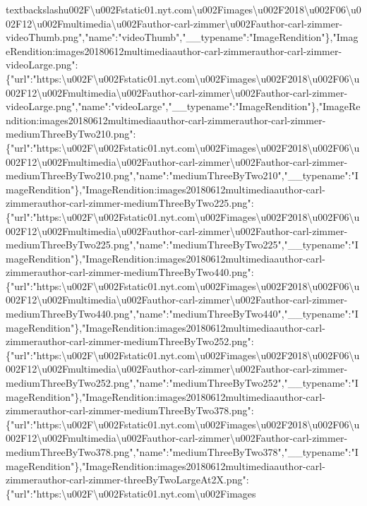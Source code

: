 textbackslash{}u002F\textbackslash{}u002Fstatic01.nyt.com\textbackslash{}u002Fimages\textbackslash{}u002F2018\textbackslash{}u002F06\textbackslash{}u002F12\textbackslash{}u002Fmultimedia\textbackslash{}u002Fauthor-carl-zimmer\textbackslash{}u002Fauthor-carl-zimmer-videoThumb.png","name":"videoThumb","\_\_typename":"ImageRendition"\},"ImageRendition:images20180612multimediaauthor-carl-zimmerauthor-carl-zimmer-videoLarge.png":\{"url":"https:\textbackslash{}u002F\textbackslash{}u002Fstatic01.nyt.com\textbackslash{}u002Fimages\textbackslash{}u002F2018\textbackslash{}u002F06\textbackslash{}u002F12\textbackslash{}u002Fmultimedia\textbackslash{}u002Fauthor-carl-zimmer\textbackslash{}u002Fauthor-carl-zimmer-videoLarge.png","name":"videoLarge","\_\_typename":"ImageRendition"\},"ImageRendition:images20180612multimediaauthor-carl-zimmerauthor-carl-zimmer-mediumThreeByTwo210.png":\{"url":"https:\textbackslash{}u002F\textbackslash{}u002Fstatic01.nyt.com\textbackslash{}u002Fimages\textbackslash{}u002F2018\textbackslash{}u002F06\textbackslash{}u002F12\textbackslash{}u002Fmultimedia\textbackslash{}u002Fauthor-carl-zimmer\textbackslash{}u002Fauthor-carl-zimmer-mediumThreeByTwo210.png","name":"mediumThreeByTwo210","\_\_typename":"ImageRendition"\},"ImageRendition:images20180612multimediaauthor-carl-zimmerauthor-carl-zimmer-mediumThreeByTwo225.png":\{"url":"https:\textbackslash{}u002F\textbackslash{}u002Fstatic01.nyt.com\textbackslash{}u002Fimages\textbackslash{}u002F2018\textbackslash{}u002F06\textbackslash{}u002F12\textbackslash{}u002Fmultimedia\textbackslash{}u002Fauthor-carl-zimmer\textbackslash{}u002Fauthor-carl-zimmer-mediumThreeByTwo225.png","name":"mediumThreeByTwo225","\_\_typename":"ImageRendition"\},"ImageRendition:images20180612multimediaauthor-carl-zimmerauthor-carl-zimmer-mediumThreeByTwo440.png":\{"url":"https:\textbackslash{}u002F\textbackslash{}u002Fstatic01.nyt.com\textbackslash{}u002Fimages\textbackslash{}u002F2018\textbackslash{}u002F06\textbackslash{}u002F12\textbackslash{}u002Fmultimedia\textbackslash{}u002Fauthor-carl-zimmer\textbackslash{}u002Fauthor-carl-zimmer-mediumThreeByTwo440.png","name":"mediumThreeByTwo440","\_\_typename":"ImageRendition"\},"ImageRendition:images20180612multimediaauthor-carl-zimmerauthor-carl-zimmer-mediumThreeByTwo252.png":\{"url":"https:\textbackslash{}u002F\textbackslash{}u002Fstatic01.nyt.com\textbackslash{}u002Fimages\textbackslash{}u002F2018\textbackslash{}u002F06\textbackslash{}u002F12\textbackslash{}u002Fmultimedia\textbackslash{}u002Fauthor-carl-zimmer\textbackslash{}u002Fauthor-carl-zimmer-mediumThreeByTwo252.png","name":"mediumThreeByTwo252","\_\_typename":"ImageRendition"\},"ImageRendition:images20180612multimediaauthor-carl-zimmerauthor-carl-zimmer-mediumThreeByTwo378.png":\{"url":"https:\textbackslash{}u002F\textbackslash{}u002Fstatic01.nyt.com\textbackslash{}u002Fimages\textbackslash{}u002F2018\textbackslash{}u002F06\textbackslash{}u002F12\textbackslash{}u002Fmultimedia\textbackslash{}u002Fauthor-carl-zimmer\textbackslash{}u002Fauthor-carl-zimmer-mediumThreeByTwo378.png","name":"mediumThreeByTwo378","\_\_typename":"ImageRendition"\},"ImageRendition:images20180612multimediaauthor-carl-zimmerauthor-carl-zimmer-threeByTwoLargeAt2X.png":\{"url":"https:\textbackslash{}u002F\textbackslash{}u002Fstatic01.nyt.com\textbackslash{}u002Fimages